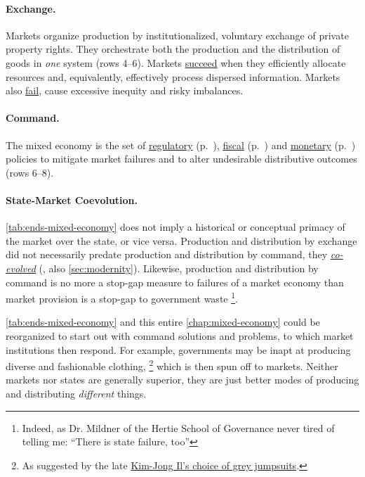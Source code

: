 \paragraph[Exchange]{Exchange.}  \label{sec:exchange} 
Markets organize production by institutionalized, voluntary exchange of private property rights. 
They orchestrate both the production and the distribution of goods in \emph{one} system (rows 4--6). 
Markets \hyperref[sec:market-solutions-production]{succeed} when they efficiently allocate resources and, equivalently, effectively process dispersed information. 
Markets also \hyperref[sec:market-failures]{fail}, cause excessive inequity and risky imbalances. 

\paragraph[Command]{Command.}  \label{sec:command} 
The mixed economy is the set of \hyperref[sec:regulatory]{regulatory} (p.~\pageref{sec:regulatory}), \hyperref[sec:fiscal]{fiscal} (p.~\pageref{sec:fiscal}) and \hyperref[sec:monetary]{monetary} (p.~\pageref{sec:monetary}) policies to mitigate market failures and to alter undesirable distributive outcomes (rows 6--8).

\paragraph{State-Market Coevolution.} \autoref{tab:ends-mixed-economy} does not imply a historical or conceptual primacy of the market over the state, or vice versa. %
Production and distribution by exchange did not necessarily predate production and distribution by command, they \hyperref[sec:modernity]{\emph{co-evolved}} (\citealt{Tilly-1985-aa}, also \autoref{sec:modernity}). 
Likewise, production and distribution by command is no more a stop-gap measure to failures of a market economy than market provision is a stop-gap to government waste
\footnote{
	Indeed, as Dr. Mildner of the Hertie School of Governance never tired of telling me: ``There is state failure, too'' %
}. 
	
\autoref{tab:ends-mixed-economy} and this entire \autoref{chap:mixed-economy} could be reorganized to start out with command solutions and problems, to which market institutions then respond. 
For example, governments may be inapt at producing diverse and fashionable clothing, 
\footnote{
	As suggested by the late \href{http://kimjongillookingatthings.tumblr.com/}{Kim-Jong Il's choice of grey jumpsuits}.} 
which is then spun off to markets. 
Neither markets nor states are generally superior, they are just better modes of producing and distributing \emph{different} things.

